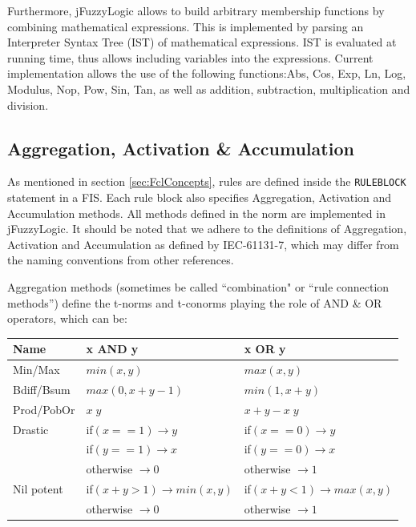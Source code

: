 \documentclass[11pt,twoside]{article}
\begin{document}
\begin{multicols}{2}
Furthermore, jFuzzyLogic allows to build arbitrary membership functions by combining mathematical expressions.
This is implemented by parsing an Interpreter Syntax Tree (IST) of mathematical expressions.
IST is evaluated at running time, thus allows including variables into the expressions.
Current implementation allows the use of the following functions:Abs, Cos, Exp, Ln, Log, Modulus, Nop, Pow, Sin, Tan, as well as addition, subtraction, multiplication and division.

\subsection{Aggregation, Activation \& Accumulation\label{sec:aggActAcc}}

As mentioned in section \ref{sec:FclConcepts}, rules are defined inside the \texttt{RULEBLOCK} statement in a FIS.
Each rule  block also specifies Aggregation, Activation and Accumulation methods.
All methods defined in the norm are implemented in jFuzzyLogic.
It should be noted that we adhere to the definitions of Aggregation, Activation and Accumulation as defined by IEC-61131-7, which may differ from the naming conventions from other references.

Aggregation methods (sometimes be called ``combination" or ``rule connection methods'') define the t-norms and t-conorms playing the role of AND \& OR operators, which can be:

\begin{scriptsize}
\begin{center}
\begin{tabular}{|l|l|l|}
\hline 
Name & x AND y & x OR y \\ 
\hline 
Min/Max & $min(x,y)$ & $max(x,y)$ \\ 
\hline 
Bdiff/Bsum & $max(0,x+y-1)$ & $min(1,x+y)$ \\ 
\hline 
Prod/PobOr & $x \; y$ & $x + y - x \; y$ \\ 
\hline 
Drastic & if$(x==1) \rightarrow y$  & if$(x==0) \rightarrow y$ \\ 
        & if$(y==1) \rightarrow x$  & if$(y==0) \rightarrow x$ \\ 
        & otherwise $\rightarrow 0$ & otherwise $\rightarrow 1$ \\ 
\hline 
Nil potent & if$( x+y > 1) \rightarrow min(x,y)$  & if$( x+y < 1) \rightarrow max(x,y)$   \\ 
           & otherwise $\rightarrow 0$            & otherwise $\rightarrow 1$ \\ 
\hline 
\end{tabular} 
\end{center}
\end{scriptsize}


\end{multicols}
\end{document}

